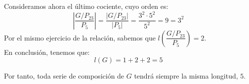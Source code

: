 \documentclass[12pt]{article}
\begin{document}
\begin{ejercicio}[2.5 puntos]
\begin{description}
            Consideramos ahora el último cociente, cuyo orden es:
            \begin{equation*}
                \left|\dfrac{G/P_{23}}{P_5}\right| = \dfrac{|G/P_{23}|}{|P_5|} = \dfrac{3^2\cdot 5^2}{5^2} = 9 = 3^2
            \end{equation*}
            Por el mismo ejercicio de la relación, sabemos que $l\left(\dfrac{G/P_{23}}{P_5}\right) = 2$. \\
            
            En conclusión, tenemos que:
            \begin{equation*}
                l(G) = 1 + 2 + 2 = 5
            \end{equation*}
        \end{description}

        Por tanto, toda serie de composición de $G$ tendrá siempre la misma longitud, $5$.
    \end{ejercicio}
\end{document}
